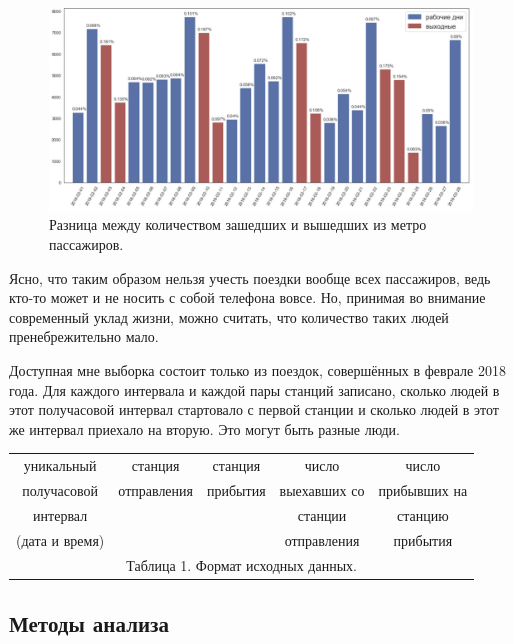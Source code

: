 \documentclass[12pt, fleqn, titlepage]{article}
\begin{document}
    \begin{figure}[ht]
        \centering
        \includegraphics[scale=0.25]{pics/disappearance.png}
        \caption{Разница между количеством зашедших и вышедших из метро пассажиров.}
        \label{disappearance}
    \end{figure}

    Ясно, что таким образом нельзя учесть поездки вообще всех пассажиров, ведь кто-то может и не носить с собой 
    телефона вовсе. Но, принимая во внимание современный уклад жизни, можно считать, что количество таких людей пренебрежительно мало. 

    Доступная мне выборка состоит только из поездок, совершённых в феврале 2018 года. Для каждого интервала и 
    каждой пары станций записано, сколько людей в этот получасовой интервал стартовало с первой станции и сколько 
    людей в этот же интервал приехало на вторую. Это могут быть разные люди. 

    \begin{center}
    \begin{tabular}{ |c|c|c|c|c| } 
    
        \hline
        уникальный & станция & станция & число & число \\
        получасовой & отправления & прибытия & выехавших со & прибывших на \\
        интервал &  &  & станции & станцию \\
        (дата и время) &  &  & отправления & прибытия \\
        \hline
        \multicolumn{5}{c}{\footnotesize Таблица 1.
        Формат исходных данных.} \\
    
    \end{tabular}
    \end{center}

    \subsection{Методы анализа}
\end{document}
